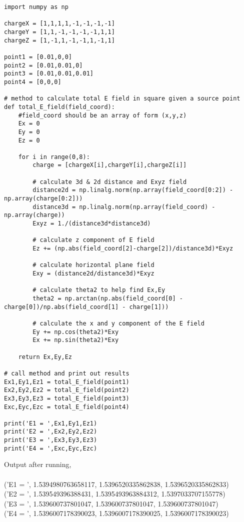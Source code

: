 \documentclass[12pt]{article}
\begin{document}
\begin{lstlisting}
import numpy as np

chargeX = [1,1,1,1,-1,-1,-1,-1]
chargeY = [1,1,-1,-1,-1,-1,1,1]
chargeZ = [1,-1,1,-1,-1,1,-1,1]

point1 = [0.01,0,0]
point2 = [0.01,0.01,0]
point3 = [0.01,0.01,0.01]
point4 = [0,0,0]

# method to calculate total E field in square given a source point
def total_E_field(field_coord):
	#field_coord should be an array of form (x,y,z)
	Ex = 0
	Ey = 0
	Ez = 0
	
	for i in range(0,8):
		charge = [chargeX[i],chargeY[i],chargeZ[i]]
		
		# calculate 3d & 2d distance and Exyz field
		distance2d = np.linalg.norm(np.array(field_coord[0:2]) - np.array(charge[0:2]))
		distance3d = np.linalg.norm(np.array(field_coord) - np.array(charge))
		Exyz = 1./(distance3d*distance3d)
		
		# calculate z component of E field
		Ez += (np.abs(field_coord[2]-charge[2])/distance3d)*Exyz
		
		# calculate horizontal plane field
		Exy = (distance2d/distance3d)*Exyz

		# calculate theta2 to help find Ex,Ey
		theta2 = np.arctan(np.abs(field_coord[0] - charge[0])/np.abs(field_coord[1] - charge[1]))
		
		# calculate the x and y component of the E field
		Ey += np.cos(theta2)*Exy
		Ex += np.sin(theta2)*Exy
		
	return Ex,Ey,Ez

# call method and print out results
Ex1,Ey1,Ez1 = total_E_field(point1)
Ex2,Ey2,Ez2 = total_E_field(point2)
Ex3,Ey3,Ez3 = total_E_field(point3)
Exc,Eyc,Ezc = total_E_field(point4)

print('E1 = ',Ex1,Ey1,Ez1)
print('E2 = ',Ex2,Ey2,Ez2)
print('E3 = ',Ex3,Ey3,Ez3)
print('E4 = ',Exc,Eyc,Ezc)
\end{lstlisting}
Output after running, \\ \\
('E1 = ', 1.5394980763658117, 1.5396520335862838, 1.5396520335862833) \\
('E2 = ', 1.539549396388431, 1.5395493963884312, 1.5397033707155778) \\
('E3 = ', 1.539600737801047, 1.539600737801047, 1.539600737801047) \\
('E4 = ', 1.5396007178390023, 1.5396007178390025, 1.5396007178390023)
\end{document}
